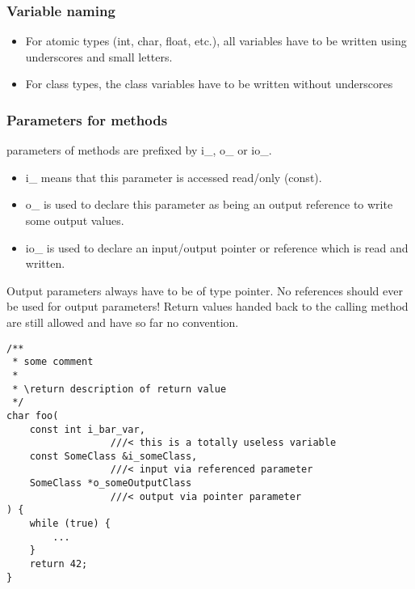 \documentclass[10pt,a4paper]{article}
\begin{document}


\subsubsection{Variable naming}

\begin{itemize}
	\item For atomic types (int, char, float, etc.), all variables have to be written using underscores and small letters.

	\item For class types, the class variables have to be written without underscores
\end{itemize}

\subsubsection{Parameters for methods}

parameters of methods are prefixed by i\_, o\_ or io\_.
\begin{itemize}
      \item i\_ means that this parameter is accessed read/only (const).
      \item o\_ is used to declare this parameter as being an output reference to write some output values.
      \item io\_ is used to declare an input/output pointer or reference which is read and written.
\end{itemize}
Output parameters always have to be of type pointer.
No references should ever be used for output parameters!
Return values handed back to the calling method are still allowed and have so far no convention.


\begin{lstlisting}
/**
 * some comment
 *
 * \return description of return value 
 */
char foo(
    const int i_bar_var,     
                  ///< this is a totally useless variable
    const SomeClass &i_someClass,    
                  ///< input via referenced parameter
    SomeClass *o_someOutputClass
                  ///< output via pointer parameter
) {
    while (true) {
        ...
    }
    return 42;
}
\end{lstlisting}
\end{document}
